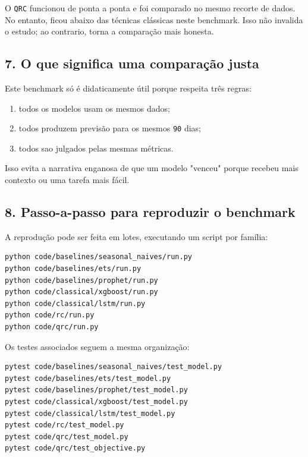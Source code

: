 \documentclass[12pt]{article}
\providecommand{\tightlist}{%
          \setlength{\itemsep}{0pt}\setlength{\parskip}{0pt}}
\begin{document}
O \texttt{QRC} funcionou de ponta a ponta e foi comparado no mesmo recorte de dados. No entanto, ficou abaixo das técnicas clássicas neste benchmark. Isso não invalida o estudo; ao contrario, torna a comparação mais honesta.

\subsection{7. O que significa uma comparação justa}\label{7-o-que-significa-uma-comparauxe7uxe3o-justa}

Este benchmark só é didaticamente útil porque respeita três regras:

\begin{enumerate}
\def\labelenumi{\arabic{enumi}.}
\tightlist
\item
  todos os modelos usam os mesmos dados;
\item
  todos produzem previsão para os mesmos \texttt{90} dias;
\item
  todos sao julgados pelas mesmas métricas.
\end{enumerate}

Isso evita a narrativa enganosa de que um modelo "venceu" porque recebeu mais contexto ou uma tarefa mais fácil.

\subsection{8. Passo-a-passo para reproduzir o benchmark}\label{8-passo-a-passo-para-reproduzir-o-benchmark}

A reprodução pode ser feita em lotes, executando um script por família:

\begin{verbatim}
python code/baselines/seasonal_naives/run.py
python code/baselines/ets/run.py
python code/baselines/prophet/run.py
python code/classical/xgboost/run.py
python code/classical/lstm/run.py
python code/rc/run.py
python code/qrc/run.py
\end{verbatim}

Os testes associados seguem a mesma organização:

\begin{verbatim}
pytest code/baselines/seasonal_naives/test_model.py
pytest code/baselines/ets/test_model.py
pytest code/baselines/prophet/test_model.py
pytest code/classical/xgboost/test_model.py
pytest code/classical/lstm/test_model.py
pytest code/rc/test_model.py
pytest code/qrc/test_model.py
pytest code/qrc/test_objective.py
\end{verbatim}
\end{document}
